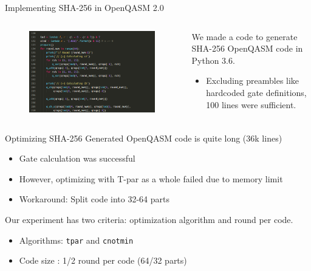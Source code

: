 \documentclass{beamer}
\begin{document}
    \begin{frame}{Implementing SHA-256 in OpenQASM 2.0}
        \begin{minipage}[0.65\textheight]{\textwidth}
        \begin{columns}[T]
            \begin{column}{0.55\textwidth}
                \begin{figure}[t]
                    \centering
                    \includegraphics[width=\textwidth]{./Images/quant-sha2-py-code.png}
                \end{figure}
            \end{column}
            \begin{column}{0.45\textwidth}
                We made a code to generate SHA-256 OpenQASM code in Python 3.6.
                \begin{itemize}
                \item Excluding preambles like hardcoded gate definitions, 100 lines were sufficient.
                \end{itemize}
            \end{column}
        \end{columns}
        \end{minipage}
    \end{frame}    
    
    \begin{frame}{Optimizing SHA-256}
        Generated OpenQASM code is quite long (36k lines)
        \begin{itemize}
            \item Gate calculation was successful
            \item However, optimizing with T-par as a whole failed due to memory limit
            \item Workaround: Split code into 32-64 parts
        \end{itemize}
        Our experiment has two criteria: optimization algorithm and round per code.
        \begin{itemize}
            \item Algorithms: \texttt{tpar}\cite{amy2014polynomial} and \texttt{cnotmin}\cite{amy2018controlled}
            \item Code size : 1/2 round per code (64/32 parts)
        \end{itemize}
    \end{frame}    
    
\end{document}
